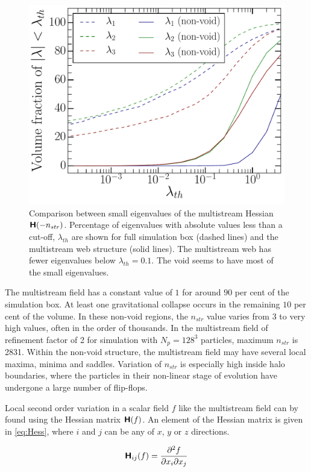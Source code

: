 \documentclass[fleqn,usenatbib,useAMS]{mnras}
\begin{document}
\begin{figure}
\begin{minipage}[t]{.99\linewidth}
  \centering\includegraphics[width=8.cm]{fig7.pdf} 

\end{minipage}\hfill
\caption{Comparison between small eigenvalues of the multistream Hessian $\textbf{\textsf{H}}(-n_{str})$. Percentage of eigenvalues with absolute values less than a cut-off, $\lambda_{th}$ are shown for full simulation box (dashed lines) and the multistream web structure (solid lines). The multistream web has fewer eigenvalues below $\lambda_{th} = 0.1$. The void seems to have most of the small eigenvalues. } 
\label{fig:lambdasSmall}
\end{figure}


The multistream field has a constant value of $1$ for around $90$ per cent of the simulation box. At least one gravitational collapse occurs in the remaining $10$ per cent of the volume. In these non-void regions, the $n_{str}$ value varies from 3 to very high values, often in the order of thousands. In the multistream field of refinement factor of 2 for simulation with $N_p = 128^3$ particles, maximum $n_{str}$ is 2831. Within the non-void structure, the multistream field may have several local maxima, minima and saddles. Variation of $n_{str}$ is especially high inside halo boundaries, where the particles in their non-linear stage of evolution have undergone a large number of flip-flops.  

Local second order variation in a scalar field $f$ like the multistream field can by found using the Hessian matrix $\textbf{\textsf{H}}(f)$. An element of the Hessian matrix is given in \autoref{eq:Hess}, where $i$ and $j$ can be any of $x$, $y$ or $z$ directions.  

\begin{equation}
\label{eq:Hess}
\textbf{\textsf{H}}_{ij}(f) = \frac{\partial^2 f}{\partial x_i \partial x_j} 
\end{equation}
\end{document}
